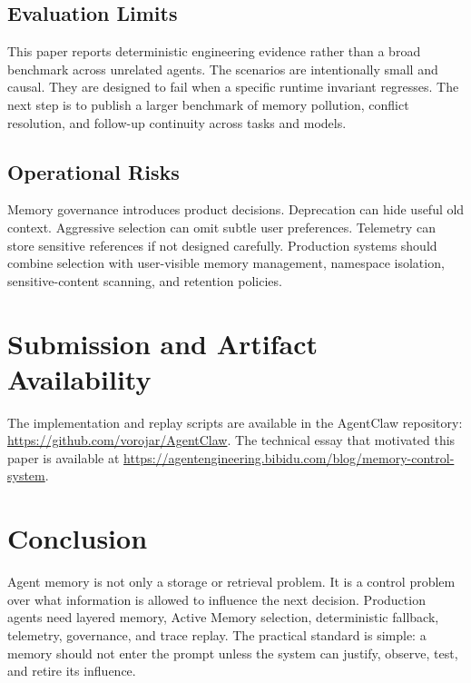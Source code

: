 \documentclass[11pt]{article}
\begin{document}
\subsection{Evaluation Limits}

This paper reports deterministic engineering evidence rather than a broad
benchmark across unrelated agents. The scenarios are intentionally small and
causal. They are designed to fail when a specific runtime invariant regresses.
The next step is to publish a larger benchmark of memory pollution, conflict
resolution, and follow-up continuity across tasks and models.

\subsection{Operational Risks}

Memory governance introduces product decisions. Deprecation can hide useful old
context. Aggressive selection can omit subtle user preferences. Telemetry can
store sensitive references if not designed carefully. Production systems should
combine selection with user-visible memory management, namespace isolation,
sensitive-content scanning, and retention policies.

\section{Submission and Artifact Availability}

The implementation and replay scripts are available in the AgentClaw repository:
\url{https://github.com/vorojar/AgentClaw}. The technical essay that motivated
this paper is available at
\url{https://agentengineering.bibidu.com/blog/memory-control-system}.

\section{Conclusion}

Agent memory is not only a storage or retrieval problem. It is a control problem
over what information is allowed to influence the next decision. Production
agents need layered memory, Active Memory selection, deterministic fallback,
telemetry, governance, and trace replay. The practical standard is simple: a
memory should not enter the prompt unless the system can justify, observe, test,
and retire its influence.



\end{document}
